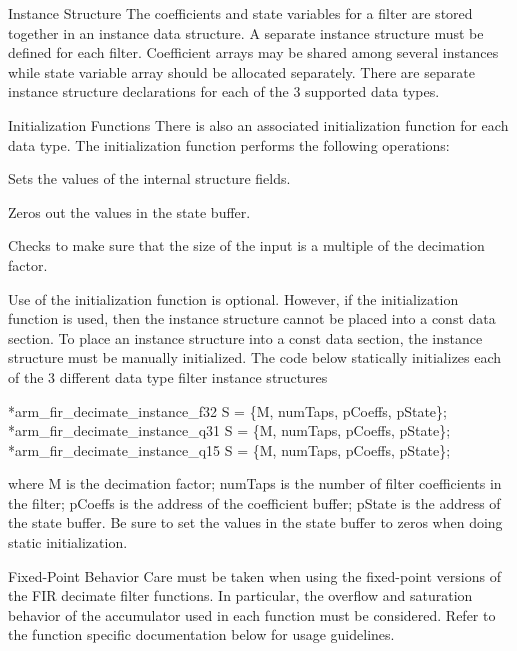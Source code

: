 \begin{DoxyParagraph}{Instance Structure }
The coefficients and state variables for a filter are stored together in an instance data structure. A separate instance structure must be defined for each filter. Coefficient arrays may be shared among several instances while state variable array should be allocated separately. There are separate instance structure declarations for each of the 3 supported data types.
\end{DoxyParagraph}
\begin{DoxyParagraph}{Initialization Functions }
There is also an associated initialization function for each data type. The initialization function performs the following operations\-:
\begin{DoxyItemize}
\item Sets the values of the internal structure fields.
\item Zeros out the values in the state buffer.
\item Checks to make sure that the size of the input is a multiple of the decimation factor.
\end{DoxyItemize}
\end{DoxyParagraph}
\begin{DoxyParagraph}{}
Use of the initialization function is optional. However, if the initialization function is used, then the instance structure cannot be placed into a const data section. To place an instance structure into a const data section, the instance structure must be manually initialized. The code below statically initializes each of the 3 different data type filter instance structures 
\begin{DoxyPre}    
*arm\_fir\_decimate\_instance\_f32 S = \{M, numTaps, pCoeffs, pState\};    
*arm\_fir\_decimate\_instance\_q31 S = \{M, numTaps, pCoeffs, pState\};    
*arm\_fir\_decimate\_instance\_q15 S = \{M, numTaps, pCoeffs, pState\};    
  \end{DoxyPre}
 where {\ttfamily M} is the decimation factor; {\ttfamily num\-Taps} is the number of filter coefficients in the filter; {\ttfamily p\-Coeffs} is the address of the coefficient buffer; {\ttfamily p\-State} is the address of the state buffer. Be sure to set the values in the state buffer to zeros when doing static initialization.
\end{DoxyParagraph}
\begin{DoxyParagraph}{Fixed-\/\-Point Behavior }
Care must be taken when using the fixed-\/point versions of the F\-I\-R decimate filter functions. In particular, the overflow and saturation behavior of the accumulator used in each function must be considered. Refer to the function specific documentation below for usage guidelines. 
\end{DoxyParagraph}


